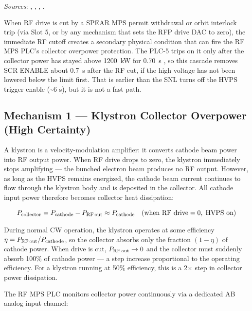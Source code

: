 \emph{Sources}: , , , .


When RF drive is cut by a SPEAR MPS permit withdrawal or orbit interlock trip (via Slot 5, or by any mechanism that sets the RFP drive DAC to zero), the immediate RF cutoff creates a secondary physical condition that can fire the RF MPS PLC's collector overpower protection. The PLC-5 trips on it only after the collector power has stayed above \qty{1200}{\kilo\watt} for \qty{0.70}{\second} , so this cascade removes SCR ENABLE about \qty{0.7}{\second} after the RF cut, if the high voltage has not been lowered below the limit first. That is earlier than the SNL turns off the HVPS trigger enable (\textasciitilde6 s), but it is not a fast path.

\subsection{Mechanism 1 --- Klystron Collector Overpower (High Certainty)}\label{sec:cascade-collector}


A klystron is a velocity-modulation amplifier: it converts cathode beam power into RF output power. When RF drive drops to zero, the klystron immediately stops amplifying --- the bunched electron beam produces no RF output. However, as long as the HVPS remains energized, the cathode beam current continues to flow through the klystron body and is deposited in the collector. All cathode input power therefore becomes collector heat dissipation:

\[P_\text{collector} = P_\text{cathode} - P_\text{RF\,out} \approx P_\text{cathode} \quad(\text{when RF drive} = 0,\; \text{HVPS on})\]

During normal CW operation, the klystron operates at some efficiency \(\eta = P_\text{RF\,out} / P_\text{cathode}\), so the collector absorbs only the fraction \((1-\eta)\) of cathode power. When drive is cut, \(P_\text{RF\,out} \rightarrow 0\) and the collector must suddenly absorb 100\% of cathode power --- a step increase proportional to the operating efficiency. For a klystron running at 50\% efficiency, this is a 2× step in collector power dissipation.

The RF MPS PLC monitors collector power continuously via a dedicated AB analog input channel:

